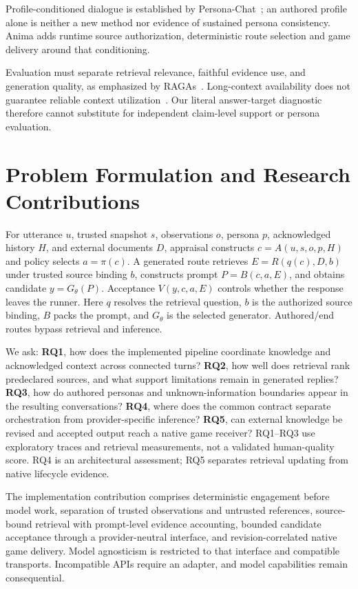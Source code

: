 \documentclass[conference]{IEEEtran}
\begin{document}
Profile-conditioned dialogue is established by Persona-Chat~\cite{zhang2018}; an authored profile alone is neither a new method nor evidence of sustained persona consistency. Anima adds runtime source authorization, deterministic route selection and game delivery around that conditioning.

Evaluation must separate retrieval relevance, faithful evidence use, and generation quality, as emphasized by RAGAs~\cite{es2024}. Long-context availability does not guarantee reliable context utilization~\cite{liu2024}. Our literal answer-target diagnostic therefore cannot substitute for independent claim-level support or persona evaluation.

\section{Problem Formulation and Research Contributions}
For utterance $u$, trusted snapshot $s$, observations $o$, persona $p$, acknowledged history $H$, and external documents $D$, appraisal constructs $c=A(u,s,o,p,H)$ and policy selects $a=\pi(c)$. A generated route retrieves $E=R(q(c),D,b)$ under trusted source binding $b$, constructs prompt $P=B(c,a,E)$, and obtains candidate $y=G_\theta(P)$. Acceptance $V(y,c,a,E)$ controls whether the response leaves the runner. Here $q$ resolves the retrieval question, $b$ is the authorized source binding, $B$ packs the prompt, and $G_\theta$ is the selected generator. Authored/end routes bypass retrieval and inference.

We ask: \textbf{RQ1}, how does the implemented pipeline coordinate knowledge and acknowledged context across connected turns? \textbf{RQ2}, how well does retrieval rank predeclared sources, and what support limitations remain in generated replies? \textbf{RQ3}, how do authored personas and unknown-information boundaries appear in the resulting conversations? \textbf{RQ4}, where does the common contract separate orchestration from provider-specific inference? \textbf{RQ5}, can external knowledge be revised and accepted output reach a native game receiver? RQ1--RQ3 use exploratory traces and retrieval measurements, not a validated human-quality score. RQ4 is an architectural assessment; RQ5 separates retrieval updating from native lifecycle evidence.

The implementation contribution comprises deterministic engagement before model work, separation of trusted observations and untrusted references, source-bound retrieval with prompt-level evidence accounting, bounded candidate acceptance through a provider-neutral interface, and revision-correlated native game delivery. Model agnosticism is restricted to that interface and compatible transports. Incompatible APIs require an adapter, and model capabilities remain consequential.
\end{document}
